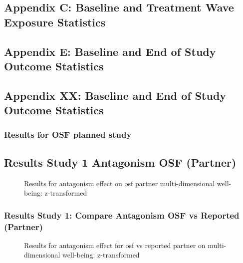 \documentclass[
  singlecolumn]{article}
\begin{document}
\subsection{Appendix C: Baseline and Treatment Wave Exposure
Statistics}\label{appendix-exposures}

\subsection{Appendix E: Baseline and End of Study Outcome
Statistics}\label{appendix-outcomes}

\subsection{Appendix XX: Baseline and End of Study Outcome
Statistics}\label{appendix-xx}

\subsubsection{Results for OSF planned
study}\label{results-for-osf-planned-study}

\subsection{Results Study 1 Antagonism OSF
(Partner)}\label{results-study-1-antagonism-osf-partner}

\begin{figure}


\caption{\label{fig-results-antagonism-partner_osf}Results for
antagonism effect on osf partner multi-dimensional well-being:
z-transformed}

\end{figure}%

\newpage{}

\subsubsection{Results Study 1: Compare Antagonism OSF vs Reported
(Partner)}\label{results-study-1-compare-antagonism-osf-vs-reported-partner}

\begin{figure}


\caption{\label{fig-results-antagonism-osf-compare}Results for
antagonism effect for osf vs reported partner on multi-dimensional
well-being: z-transformed}

\end{figure}%
\end{document}
